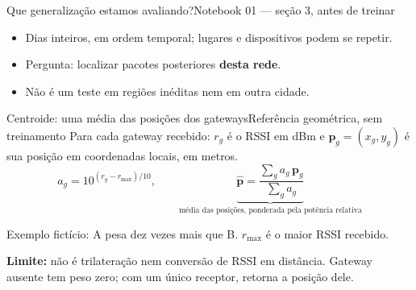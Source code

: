 \documentclass[aspectratio=169,10pt]{beamer}
\begin{document}
\begin{frame}{Que generalização estamos avaliando?}{Notebook 01 — seção 3, antes de treinar}
\centering
{}
\begin{itemize}
\item Dias inteiros, em ordem temporal; lugares e dispositivos podem se repetir.
\item Pergunta: localizar pacotes posteriores \textbf{desta rede}.
\item Não é um teste em regiões inéditas nem em outra cidade.
\end{itemize}
\end{frame}

\begin{frame}{Centroide: uma média das posições dos gateways}{Referência geométrica, sem treinamento}
\small
\setlength{\abovedisplayskip}{4pt}\setlength{\belowdisplayskip}{4pt}
Para cada gateway recebido: $r_g$ é o RSSI em dBm e $\mathbf p_g=(x_g,y_g)$
é sua posição em coordenadas locais, em metros.
\[
a_g=10^{(r_g-r_{\max})/10},
\qquad
\underbrace{\widehat{\mathbf p}=\frac{\sum_g a_g\,\mathbf p_g}{\sum_g a_g}}_{\text{média das posições, ponderada pela potência relativa}}
\]
\centering
{}
\par\vspace{2mm}\raggedright
Exemplo fictício: A pesa dez vezes mais que B. $r_{\max}$ é o maior RSSI recebido.
\par\vspace{2mm}
\textbf{Limite:} não é trilateração nem conversão de RSSI em distância.
Gateway ausente tem peso zero; com um único receptor, retorna a posição dele.
\end{frame}
\end{document}
